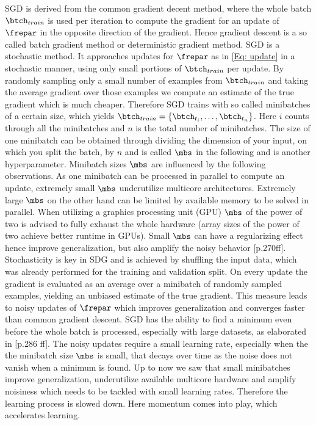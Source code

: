 SGD is derived from the common gradient decent method, where the whole batch \(\btch_{train}\) is used per iteration to compute the gradient for an update of \(\frepar\) in the opposite direction of the gradient. Hence gradient descent is a so called batch gradient method or deterministic gradient method. SGD is a stochastic method. It approaches updates for \(\frepar\) as in \cref{Eq: update} in a stochastic manner, using only small portions of \(\btch_{train}\) per update. By randomly sampling only a small number of examples from \(\btch_{train}\) and taking the average gradient over those examples we compute an estimate of the true gradient which is much cheaper. Therefore SGD trains with so called minibatches of a certain size, which yields \(\btch_{train} = \{\btch_{t_i},\dots,\btch_{t_n}\}\). Here \(i\) counts through all the minibatches and \(n\) is the total number of minibatches. The size of one minibatch can be obtained through dividing the dimension of your input, on which you split the batch, by \(n\) and is called \(\mbs\) in the following and is another hyperparameter. Minibatch sizes \(\mbs\) are influenced by the following observations. As one minibatch can be processed in parallel to compute an update, extremely small \(\mbs\) underutilize multicore architectures. Extremely large \(\mbs\) on the other hand can be limited by available memory to be solved in parallel. When utilizing a graphics processing unit (GPU) \(\mbs\) of the power of two is advised to fully exhaust the whole hardware (array sizes of the power of two achieve better runtime in GPUs). Small \(\mbs\) can have a regularizing effect hence improve generalization, but also amplify the noisy behavior \cite{Goodfellow}[p.270ff].\\
Stochasticity is key in SDG and is achieved by shuffling the input data, which was already performed for the training and validation split. On every update the gradient is evaluated as an average over a minibatch of randomly sampled examples, yielding an unbiased estimate of the true gradient. This measure leads to noisy updates of \(\frepar\) which improves generalization and converges faster than common gradient descent. SGD has the ability to find a minimum even before the whole batch is processed, especially with large datasets, as elaborated in \cite{Goodfellow}[p.286 ff]. 
The noisy updates require a small learning rate, especially when the the minibatch size  \(\mbs\) is small, that decays over time as the noise does not vanish when a minimum is found. Up to now we saw that small minibatches improve generalization, underutilize available multicore hardware and amplify noisiness which needs to be tackled with small learning rates. Therefore the learning process is slowed down. Here momentum comes into play, which accelerates learning.\\
